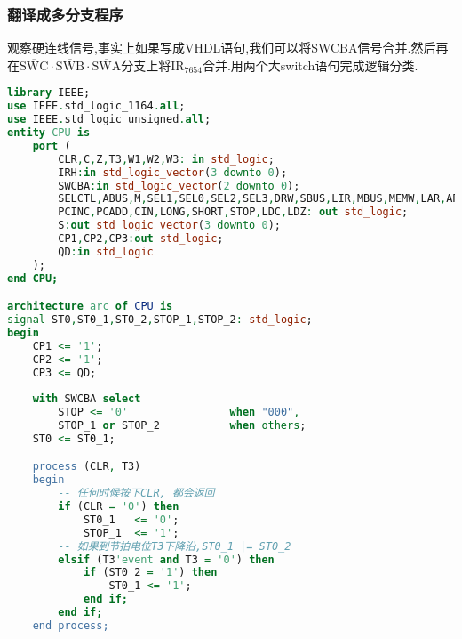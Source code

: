 \documentclass[UTF8]{ctexart}
\begin{document}
\subsubsection{翻译成多分支程序}
观察硬连线信号,事实上如果写成VHDL语句,我们可以将SWCBA信号合并.然后再在$\overline{\text{SWC}}\cdot \overline{\text{SWB}}\cdot \overline{\text{SWA}}$分支上将$\text{IR}_{7654}$合并.用两个大switch语句完成逻辑分类.
{\firacode
\begin{lstlisting}[language={VHDL}]
library IEEE;
use IEEE.std_logic_1164.all;
use IEEE.std_logic_unsigned.all;
entity CPU is
	port (
		CLR,C,Z,T3,W1,W2,W3: in std_logic;
		IRH:in std_logic_vector(3 downto 0);
		SWCBA:in std_logic_vector(2 downto 0);
		SELCTL,ABUS,M,SEL1,SEL0,SEL2,SEL3,DRW,SBUS,LIR,MBUS,MEMW,LAR,ARINC,LPC,
		PCINC,PCADD,CIN,LONG,SHORT,STOP,LDC,LDZ: out std_logic;
		S:out std_logic_vector(3 downto 0);
		CP1,CP2,CP3:out std_logic;	
		QD:in std_logic	
	);
end CPU;

architecture arc of CPU is
signal ST0,ST0_1,ST0_2,STOP_1,STOP_2: std_logic;
begin
	CP1 <= '1';
	CP2 <= '1';
	CP3 <= QD;
	
	with SWCBA select
		STOP <= '0'                when "000",
		STOP_1 or STOP_2           when others;
	ST0 <= ST0_1;

	process (CLR, T3)
	begin
		-- 任何时候按下CLR, 都会返回
		if (CLR = '0') then
			ST0_1	<= '0';
			STOP_1	<= '1';
		-- 如果到节拍电位T3下降沿,ST0_1 |= ST0_2
		elsif (T3'event and T3 = '0') then
			if (ST0_2 = '1') then
				ST0_1 <= '1';
			end if;
		end if;
	end process;
	

\end{lstlisting}}
\end{document}
